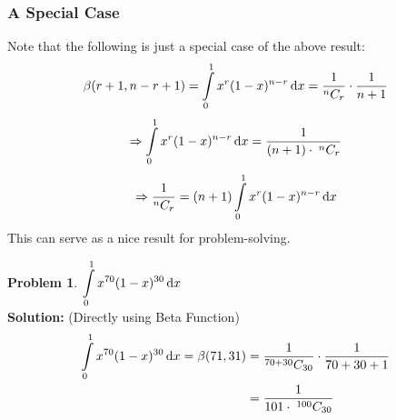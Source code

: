 \documentclass[14]{article}
\theoremstyle{definition}
\newtheorem{prob}{Problem}
\theoremstyle{case}
\begin{document}
\subsubsection*{A Special Case}
Note that the following is just a special case of the above result:
\[\beta(r+1, n-r+1)=\int\limits_0^1 x^r (1-x)^{n-r} \dif x = \dfrac1{^nC_r} \cdot \dfrac1{n+1}\]
\[\Rightarrow \int\limits_0^1 x^r (1-x)^{n-r} \dif x = \dfrac1{(n+1)\cdot\;^nC_r}\]
\[\Rightarrow \dfrac1{^nC_r} = (n+1) \int\limits_0^1 x^r(1-x)^{n-r} \dif x\]
This can serve as a nice result for problem-solving.
\begin{prob}
$\displaystyle\int\limits_0^1 x^{70} (1-x)^{30} \dif x$\\
\textbf{Solution:} (Directly using Beta Function)
\begin{align*}
\int\limits_0^1 x^{70} (1-x)^{30} \dif x = \beta(71, 31) &= \dfrac1{^{70+30}C_{30}} \cdot \dfrac1{70+30+1}\\
&= \dfrac1{101 \cdot \; ^{100}C_{30}}
\end{align*}
\end{prob}
\end{document}
